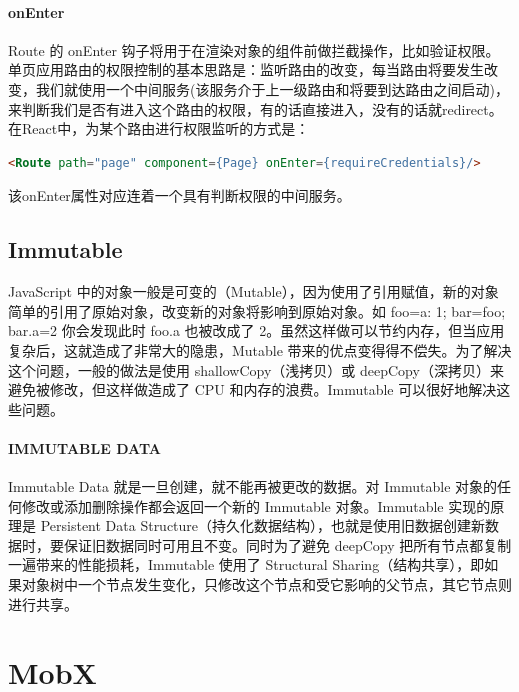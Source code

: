 \documentclass[letter]{book}
\begin{document}
\paragraph{onEnter}

Route 的 onEnter 钩子将用于在渲染对象的组件前做拦截操作，比如验证权限。单页应用路由的权限控制的基本思路是：监听路由的改变，每当路由将要发生改变，我们就使用一个中间服务(该服务介于上一级路由和将要到达路由之间启动)，来判断我们是否有进入这个路由的权限，有的话直接进入，没有的话就redirect。在React中，为某个路由进行权限监听的方式是：

\begin{lstlisting}[language=HTML]
<Route path="page" component={Page} onEnter={requireCredentials}/>
\end{lstlisting}

该onEnter属性对应连着一个具有判断权限的中间服务。

\subsection{Immutable}

JavaScript 中的对象一般是可变的（Mutable），因为使用了引用赋值，新的对象简单的引用了原始对象，改变新的对象将影响到原始对象。如 foo={a: 1}; bar=foo; bar.a=2 你会发现此时 foo.a 也被改成了 2。虽然这样做可以节约内存，但当应用复杂后，这就造成了非常大的隐患，Mutable 带来的优点变得得不偿失。为了解决这个问题，一般的做法是使用 shallowCopy（浅拷贝）或 deepCopy（深拷贝）来避免被修改，但这样做造成了 CPU 和内存的浪费。Immutable 可以很好地解决这些问题。

\paragraph{IMMUTABLE DATA}

Immutable Data 就是一旦创建，就不能再被更改的数据。对 Immutable 对象的任何修改或添加删除操作都会返回一个新的 Immutable 对象。Immutable 实现的原理是 Persistent Data Structure（持久化数据结构），也就是使用旧数据创建新数据时，要保证旧数据同时可用且不变。同时为了避免 deepCopy 把所有节点都复制一遍带来的性能损耗，Immutable 使用了 Structural Sharing（结构共享），即如果对象树中一个节点发生变化，只修改这个节点和受它影响的父节点，其它节点则进行共享。



\section{MobX}
\end{document}
